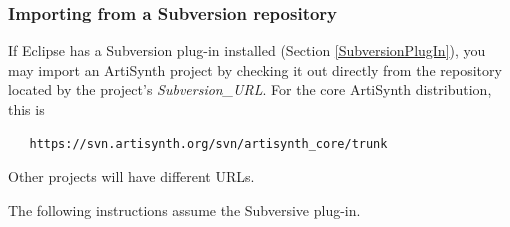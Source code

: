 \subsubsection{Importing from a Subversion repository}
\label{importingFromSubversion}

If Eclipse has a Subversion plug-in installed (Section
\ref{SubversionPlugIn}), you may import an ArtiSynth project by
checking it out directly from the repository located by
the project's {\it Subversion\_URL}. For the core ArtiSynth
distribution, this is 
\begin{verbatim}
   https://svn.artisynth.org/svn/artisynth_core/trunk
\end{verbatim}
Other projects will have different URLs.

The following instructions assume the Subversive plug-in.

